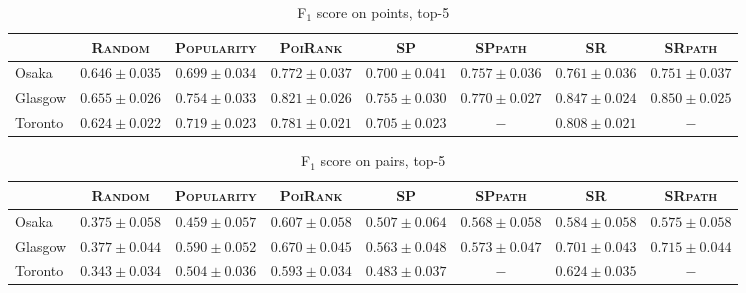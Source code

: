 \begin{table*}[t]
\caption{F$_1$ score on points, top-5}
\centering
\small
\setlength{\tabcolsep}{4pt} %
\begin{tabular}{l|cc|cc|ccc} \hline
 & \textsc{Random} & \textsc{Popularity} & \textsc{PoiRank} & \textsc{SP} & \textsc{SPpath} & \textsc{SR} & \textsc{SRpath} \\ \hline
Osaka & $0.646\pm0.035$ & $0.699\pm0.034$ & $\mathbf{0.772\pm0.037}$ & $0.700\pm0.041$ & $0.757\pm0.036$ & $\mathit{0.761\pm0.036}$ & $0.751\pm0.037$ \\
Glasgow & $0.655\pm0.026$ & $0.754\pm0.033$ & $0.821\pm0.026$ & $0.755\pm0.030$ & $0.770\pm0.027$ & $\mathit{0.847\pm0.024}$ & $\mathbf{0.850\pm0.025}$ \\
Toronto & $0.624\pm0.022$ & $0.719\pm0.023$ & $\mathit{0.781\pm0.021}$ & $0.705\pm0.023$ & $-$ & $\mathbf{0.808\pm0.021}$ & $-$ \\
\hline
\end{tabular}
\end{table*}

\begin{table*}[t]
\caption{F$_1$ score on pairs, top-5}
\centering
\small
\setlength{\tabcolsep}{4pt} %
\begin{tabular}{l|cc|cc|ccc} \hline
 & \textsc{Random} & \textsc{Popularity} & \textsc{PoiRank} & \textsc{SP} & \textsc{SPpath} & \textsc{SR} & \textsc{SRpath} \\ \hline
Osaka & $0.375\pm0.058$ & $0.459\pm0.057$ & $\mathbf{0.607\pm0.058}$ & $0.507\pm0.064$ & $0.568\pm0.058$ & $\mathit{0.584\pm0.058}$ & $0.575\pm0.058$ \\
Glasgow & $0.377\pm0.044$ & $0.590\pm0.052$ & $0.670\pm0.045$ & $0.563\pm0.048$ & $0.573\pm0.047$ & $\mathit{0.701\pm0.043}$ & $\mathbf{0.715\pm0.044}$ \\
Toronto & $0.343\pm0.034$ & $0.504\pm0.036$ & $\mathit{0.593\pm0.034}$ & $0.483\pm0.037$ & $-$ & $\mathbf{0.624\pm0.035}$ & $-$ \\
\hline
\end{tabular}
\end{table*}

